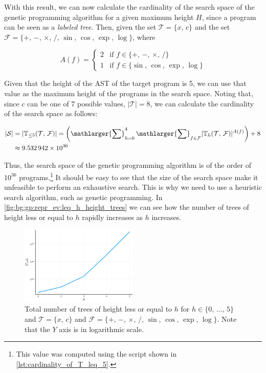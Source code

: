   With this result, we can now calculate the cardinality of the search space of
  the genetic programming algorithm for a given maximum height \(H\), since a
  program can be seen as a \emph{labeled tree}.
  Then, given the set \(\mathcal{T} = \{x,\, c\}\) and the set \(\mathcal{F} =
  \{+,\, -,\, \times,\, /,\, \sin,\, \cos,\, \exp,\, \log\}\), where 

  \[
    A(f) = \begin{cases}
      2 & \text{if } f \in \{+,\, -,\, \times,\, /\} \\
      1 & \text{if } f \in \{\sin,\, \cos,\, \exp,\, \log\}
    \end{cases}
  \]

  Given that the height of the AST of the target program is 5, we can use that
  value as the maximum height of the programs in the search space.
  Noting that, since \(c\) can be one of 7 possible values, \(|\mathcal{T}| = 
  8\), we can calculate the cardinality of the search space as follows:

  \begin{align*}
    |\mathcal{S}| 
      &= |\mathbb{T}_{\leq 5}(\mathcal{T},\, \mathcal{F})| 
        = \left(\mathlarger{\sum}_{h = 0}^{4}\,
          \mathlarger{\sum}_{f \in \mathcal{F}} 
          |\mathbb{T}_{h}(\mathcal{T},\, \mathcal{F})|^{A(f)}
        \right) + 8 \\
      &\approx 9.532\,942 \times 10^{36}
  \end{align*}

  Thus, the search space of the genetic programming algorithm is of the order of
  \(10^{36}\) programs.\footnote{%
    This value was computed using the script shown in 
    \vref{lst:cardinality_of_T_leq_5}.
  }
  It should be easy to see that the size of the search space make it unfeasible
  to perform an exhaustive search.
  This is why we need to use a heuristic search algorithm, such as genetic
  programming.
  In \vref{fig:bg:gp:repr_ev:leq_h_height_trees} we can see how the number of
  trees of height less or equal to \(h\) rapidly increases as \(h\) increases.

  \begin{figure}[ht!]
    \centering
    \includegraphics[width=0.5\textwidth]{img/theoretical_framework/t_leq.png}
    \caption{
      Total number of trees of height less or equal to \(h\) for \(h \in
      \{0,\, \ldots,\, 5\}\) and \(\mathcal{T} = \{x,\, c\}\) and \(\mathcal{F}
      = \{+,\, -,\, \times,\, /,\, \sin,\, \cos,\, \exp,\, \log\}\).
      Note that the \(Y\) axis is in logarithmic scale.
    }
    \label{fig:bg:gp:repr_ev:leq_h_height_trees}
  \end{figure}